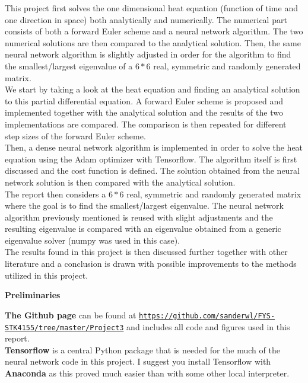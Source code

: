 \documentclass[12pt,a4paper]{article}
\begin{document}
\noindent This project first solves the one dimensional heat equation (function of time and one direction in space) both analytically and numerically. The numerical part consists of both a forward Euler scheme and a neural network algorithm. The two numerical solutions are then compared to the analytical solution. Then, the same neural network algorithm is slightly adjusted in order for the algorithm to find the smallest/largest eigenvalue of a $6*6$ real, symmetric and randomly generated matrix.
\\
We start by taking a look at the heat equation and finding an analytical solution to this partial differential equation. A forward Euler scheme is proposed and implemented together with the analytical solution and the results of the two implementations are compared. The comparison is then repeated for different step sizes of the forward Euler scheme.
\\
Then, a dense neural network algorithm is implemented in order to solve the heat equation using the Adam optimizer with Tensorflow. The algorithm itself is first discussed and the cost function is defined. The solution obtained from the neural network solution is then compared with the analytical solution.
\\
The report then considers a $6*6$ real, symmetric and randomly generated matrix where the goal is to find the smallest/largest eigenvalue. The neural network algorithm previously mentioned is reused with slight adjustments and the resulting eigenvalue is compared with an eigenvalue obtained from a generic eigenvalue solver (numpy was used in this case).
\\
The results found in this project is then discussed further together with other literature and a conclusion is drawn with possible improvements to the methods utilized in this project.

\newpage

\begin{center}
\Large{\textbf{Preliminaries}}
\end{center}

\noindent \textbf{The Github page} can be found at \href{{https://github.com/sanderwl/FYS-STK4155/tree/master/Project3}}{\nolinkurl{https://github.com/sanderwl/FYS-STK4155/tree/master/Project3}} and includes all code and figures used in this report.
\\
\textbf{Tensorflow} is a central Python package that is needed for the much of the neural network code in this project. I suggest you install Tensorflow with \textbf{Anaconda} as this proved much easier than with some other local interpreter.
\end{document}
